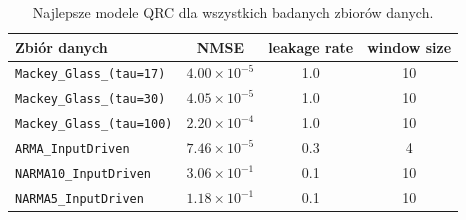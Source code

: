\begin{table}[ht]
\centering
\caption{Najlepsze modele QRC dla wszystkich badanych zbiorów danych.}
\label{tab:qrc-summary-all}
\begin{tabular}{lccc}
\toprule
Zbiór danych & NMSE & leakage rate & window size \\
\midrule
\texttt{Mackey\_Glass\_(tau=17)} & $4.00 \times 10^{-5}$ & 1.0 & 10 \\
\texttt{Mackey\_Glass\_(tau=30)} & $4.05 \times 10^{-5}$ & 1.0 & 10 \\
\texttt{Mackey\_Glass\_(tau=100)} & $2.20 \times 10^{-4}$ & 1.0 & 10 \\
\texttt{ARMA\_InputDriven} & $7.46 \times 10^{-5}$ & 0.3 & 4 \\
\texttt{NARMA10\_InputDriven} & $3.06 \times 10^{-1}$ & 0.1 & 10 \\
\texttt{NARMA5\_InputDriven} & $1.18 \times 10^{-1}$ & 0.1 & 10 \\
\bottomrule
\end{tabular}
\end{table}